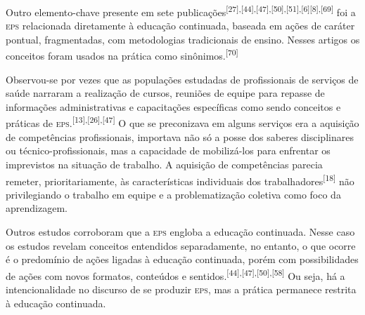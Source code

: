 \documentclass{article}
\begin{document}
Outro elemento-chave presente em sete publicações\textsuperscript{[}\textsuperscript{27}\textsuperscript{]}\textsuperscript{,}\textsuperscript{[}\textsuperscript{44}\textsuperscript{]}\textsuperscript{,}\textsuperscript{[}\textsuperscript{47}\textsuperscript{]}\textsuperscript{,}\textsuperscript{[}\textsuperscript{50}\textsuperscript{]}\textsuperscript{,}\textsuperscript{[}\textsuperscript{51}\textsuperscript{]}\textsuperscript{,}\textsuperscript{[}\textsuperscript{6}\textsuperscript{]}\textsuperscript{[}\textsuperscript{8}\textsuperscript{]}\textsuperscript{,}\textsuperscript{[}\textsuperscript{69}\textsuperscript{]}
foi a \textsc{eps} relacionada diretamente à educação continuada, baseada em ações de
caráter pontual, fragmentadas, com metodologias tradicionais de ensino. Nesses
artigos os conceitos foram usados na prática como sinônimos.\textsuperscript{[}\textsuperscript{70}\textsuperscript{]}

Observou-se por vezes que as populações estudadas de profissionais de serviços
de saúde narraram a realização de cursos, reuniões de equipe para repasse de
informações administrativas e capacitações específicas como sendo conceitos e
práticas de \textsc{eps}.\textsuperscript{[}\textsuperscript{13}\textsuperscript{]}\textsuperscript{,}\textsuperscript{[}\textsuperscript{26}\textsuperscript{]}\textsuperscript{,}\textsuperscript{[}\textsuperscript{47}\textsuperscript{]}
O que se preconizava em alguns serviços era a aquisição de competências
profissionais, importava não só a posse dos saberes disciplinares ou
técnico-profissionais, mas a capacidade de mobilizá-los para enfrentar os
imprevistos na situação de trabalho. A aquisição de competências parecia
remeter, prioritariamente, às características individuais dos trabalhadores\textsuperscript{[}\textsuperscript{18}\textsuperscript{]}
não privilegiando o trabalho em equipe e a problematização coletiva como foco da
aprendizagem.

Outros estudos corroboram que a \textsc{eps} engloba a educação continuada. Nesse caso os
estudos revelam conceitos entendidos separadamente, no entanto, o que ocorre é o
predomínio de ações ligadas à educação continuada, porém com possibilidades de
ações com novos formatos, conteúdos e sentidos.\textsuperscript{[}\textsuperscript{44}\textsuperscript{]}\textsuperscript{,}\textsuperscript{[}\textsuperscript{47}\textsuperscript{]}\textsuperscript{,}\textsuperscript{[}\textsuperscript{50}\textsuperscript{]}\textsuperscript{,}\textsuperscript{[}\textsuperscript{58}\textsuperscript{]}
Ou seja, há a intencionalidade no discurso de se produzir \textsc{eps}, mas a prática
permanece restrita à educação continuada.
\end{document}
